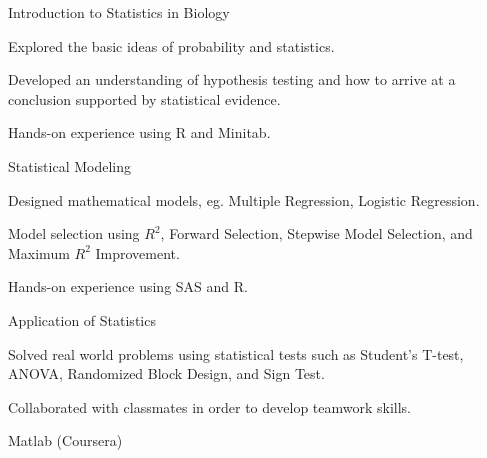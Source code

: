 

\begin{cventries}

  \cventry
    {Introduction to Statistics in Biology} %
    {} %
    {} %
    {} %
    {
    \begin{cvitems}
    \item Explored the basic ideas of probability and statistics.
    \item Developed an understanding of hypothesis testing and how to arrive at a conclusion supported by statistical evidence.
    \item Hands-on experience using R and Minitab.
    \end{cvitems}
    }

  \cventry
    {Statistical Modeling} %
    {} %
    {} %
    {} %
    {
      \begin{cvitems}
      \item Designed mathematical models, eg. Multiple Regression, Logistic Regression.
      \item Model selection using $R^2$, Forward Selection, Stepwise Model Selection, and Maximum $R^2$ Improvement.
      \item Hands-on experience using SAS and R.
      \end{cvitems}
    }

      \cventry
    {Application of Statistics} %
    {} %
    {} %
    {} %
    {
      \begin{cvitems}
      \item Solved real world problems using statistical tests such as Student's T-test, ANOVA, Randomized Block Design, and Sign Test.
        \item Collaborated with classmates in order to develop teamwork skills.
      \end{cvitems}
    }
    \cventry
    {Matlab (Coursera)}
    {}
    {}
    {}
    {
    }
\end{cventries}
